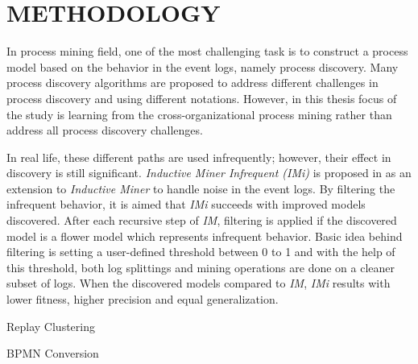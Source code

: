 \chapter{METHODOLOGY}
\label{chp:methodology}


\label{subchp:approach-overview}

\label{subchp:process-model-mining}
In process mining field, one of the most challenging task is to construct a process model based on the behavior in the event logs, namely process discovery. Many process discovery algorithms are proposed to address different challenges in process discovery and using different notations. However, in this thesis focus of the study is learning from the cross-organizational process mining rather than address all process discovery challenges.

 In real life, these different paths are used infrequently; however, their effect in discovery is still significant. \textit{Inductive Miner Infrequent (IMi)} is proposed in \cite{leemans2014discoveringinfrequent} as an extension to \textit{Inductive Miner} to handle noise in the event logs. By filtering the infrequent behavior, it is aimed that \textit{IMi} succeeds with improved models discovered. After each recursive step of \textit{IM}, filtering is applied if the discovered model is a flower model which represents infrequent behavior. Basic idea behind filtering is setting a user-defined threshold between 0 to 1 and with the help of this threshold, both log splittings and mining operations are done on a cleaner subset of logs. When the discovered models compared to \textit{IM}, \textit{IMi} results with lower fitness, higher precision and equal generalization.

 

\label{subchp:performance-indicator-analysis}
	Replay
	Clustering

\label{subchp:mismatch-pattern-analysis}
	BPMN Conversion


\label{subchp:recommendation-generation}



\label{subchp:implementation}